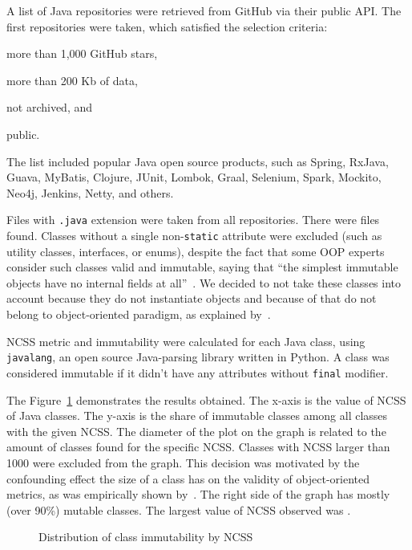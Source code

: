 \documentclass[3p,times,procedia]{elsarticle}
\begin{document}
A list of Java repositories were retrieved from GitHub via their
public API. The first \thetotalrepos{} repositories were taken, which satisfied
the selection criteria:
\begin{enumerate*}[label={\arabic*)}]
\item more than 1,000 GitHub stars,
\item more than 200 Kb of data,
\item not archived, and
\item public.
\end{enumerate*}
The list included popular Java open source products, such as
Spring, RxJava, Guava, MyBatis, Clojure, JUnit, Lombok,
Graal, Selenium, Spark, Mockito, Neo4j, Jenkins, Netty, and others.

Files with \texttt{.java} extension were taken from all repositories.
There were \thetotaljavafiles{} files found. Classes without a single
non-\texttt{static} attribute were excluded (such as utility classes,
interfaces, or enums), despite the fact that some OOP
experts consider such classes valid and immutable, saying that
``the simplest immutable objects have no internal fields at all''~\citep{lea2000}.
We decided to not take these classes into account because they do not instantiate objects
and because of that do not belong to object-oriented paradigm,
as explained by~\cite{west2004,bugayenko2017}.

NCSS metric and immutability were calculated for each Java class,
using \texttt{javalang}, an open source Java-parsing library written in Python.
A class was considered immutable if it didn't have any
attributes without \texttt{final} modifier.

The Figure~\ref{fig:1} demonstrates the results obtained. The x-axis is
the value of NCSS of Java classes. The y-axis is the share of immutable classes among
all classes with the given NCSS. The diameter of the plot on the graph
is related to the amount of classes found for the specific NCSS. Classes
with NCSS larger than 1000 were excluded from the graph. This decision was
motivated by the confounding effect the size of a class has
on the validity of object-oriented metrics, as was empirically shown by~\citet{el2001}.
The right side of the graph has mostly (over 90\%) mutable classes. The largest
value of NCSS observed was \thelargestncss{}.

\begin{figure}[h]
  
  \caption{Distribution of class immutability by NCSS}
  \label{fig:1}
\end{figure}
\end{document}
